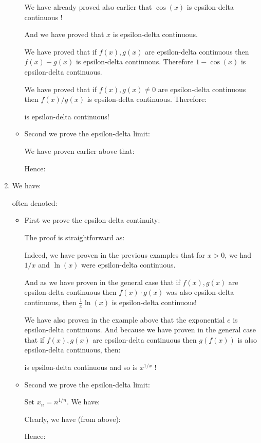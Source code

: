 \begin{enumerate}
\begin{itemize}
			We have already proved also earlier that $\cos(x)$ is epsilon-delta continuous !
			
			And we have proved that $x$ is epsilon-delta continuous.
			
			We have proved that if $f(x),g(x)$ are epsilon-delta continuous then $f(x)-g(x)$ is epsilon-delta continuous. Therefore $1-\cos(x)$ is epsilon-delta continuous.
			
			We have proved that if $f(x),g(x)\neq 0$ are epsilon-delta continuous then $f(x)/g(x)$ is epsilon-delta continuous. Therefore:
			
			is epsilon-delta continuous!
			
			\item Second we prove the epsilon-delta limit:
			
			We have proven earlier above that:
			
			Hence:
			
		\end{itemize}
		
		\item We have:
			
			often denoted:
			
		
		\begin{itemize}
			\item First we prove the epsilon-delta continuity:
			
			The proof is straightforward as:
			
			Indeed, we have proven in the previous examples that for $x>0$, we had $1/x$ and $\ln(x)$ were epsilon-delta continuous.
			
			And as we have proven in the general case that if $f(x),g(x)$ are epsilon-delta continuous then $f(x)\cdot g(x)$ was also epsilon-delta continuous, then $\frac{1}{x} \ln (x)$ is epsilon-delta continuous!
			
			We have also proven in the example above that the exponential $e$ is epsilon-delta continuous. And because we have proven in the general case that if $f(x),g(x)$ are epsilon-delta continuous then $g(f(x))$ is also epsilon-delta continuous, then:
			
			is epsilon-delta continuous and so is $x^{1/x}$ !
			
			\item Second we prove the epsilon-delta limit:
			
			Set $x_n=n^{1 / n}$. We have:
			
			Clearly, we have (from above):
			
			Hence:
			

\end{itemize}
\end{enumerate}
